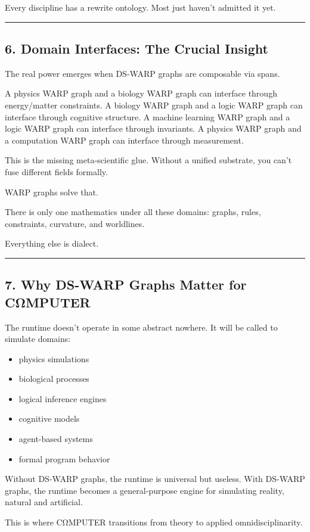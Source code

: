 Every discipline has a rewrite ontology. Most just haven't admitted it
yet.

\begin{center}\rule{0.5\linewidth}{0.5pt}\end{center}

\subsection{6. Domain Interfaces: The Crucial
Insight}\label{domain-interfaces-the-crucial-insight}

The real power emerges when DS-WARP graphs are composable via spans.

A physics WARP graph and a biology WARP graph can interface through energy/matter
constraints. A biology WARP graph and a logic WARP graph can interface through
cognitive structure. A machine learning WARP graph and a logic WARP graph can
interface through invariants. A physics WARP graph and a computation WARP graph can
interface through measurement.

This is the missing meta-scientific glue. Without a unified substrate,
you can't fuse different fields formally.

WARP graphs solve that.

There is only one mathematics under all these domains: graphs, rules,
constraints, curvature, and worldlines.

Everything else is dialect.

\begin{center}\rule{0.5\linewidth}{0.5pt}\end{center}

\subsection{7. Why DS-WARP Graphs Matter for
CΩMPUTER}\label{why-ds-rmgs-matter-for-cux3c9mputer}

The runtime doesn't operate in some abstract nowhere. It will be called
to simulate domains:

\begin{itemize}
\tightlist
\item
  physics simulations
\item
  biological processes
\item
  logical inference engines
\item
  cognitive models
\item
  agent-based systems
\item
  formal program behavior
\end{itemize}

Without DS-WARP graphs, the runtime is universal but useless. With DS-WARP graphs, the
runtime becomes a general-purpose engine for simulating reality, natural
and artificial.

This is where CΩMPUTER transitions from theory to applied
omnidisciplinarity.
